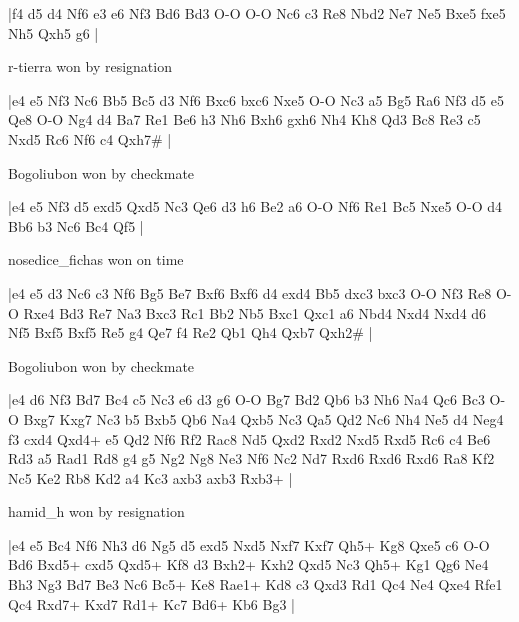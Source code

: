 \makegametitle
|f4 d5 d4 Nf6 e3 e6 Nf3 Bd6 Bd3 O-O O-O Nc6 c3 Re8 Nbd2 Ne7 Ne5 Bxe5 fxe5 Nh5 Qxh5 g6  |

\showboard

r-tierra won by resignation

\makegametitle
|e4 e5 Nf3 Nc6 Bb5 Bc5 d3 Nf6 Bxc6 bxc6 Nxe5 O-O Nc3 a5 Bg5 Ra6 Nf3 d5 e5 Qe8 O-O Ng4 d4 Ba7 Re1 Be6 h3 Nh6 Bxh6 gxh6 Nh4 Kh8 Qd3 Bc8 Re3 c5 Nxd5 Rc6 Nf6 c4 Qxh7\#  |

\showboard

Bogoliubon won by checkmate

\makegametitle
|e4 e5 Nf3 d5 exd5 Qxd5 Nc3 Qe6 d3 h6 Be2 a6 O-O Nf6 Re1 Bc5 Nxe5 O-O d4 Bb6 b3 Nc6 Bc4 Qf5  |

\showboard

nosedice\_fichas won on time

\makegametitle
|e4 e5 d3 Nc6 c3 Nf6 Bg5 Be7 Bxf6 Bxf6 d4 exd4 Bb5 dxc3 bxc3 O-O Nf3 Re8 O-O Rxe4 Bd3 Re7 Na3 Bxc3 Rc1 Bb2 Nb5 Bxc1 Qxc1 a6 Nbd4 Nxd4 Nxd4 d6 Nf5 Bxf5 Bxf5 Re5 g4 Qe7 f4 Re2 Qb1 Qh4 Qxb7 Qxh2\#  |

\showboard

Bogoliubon won by checkmate

\makegametitle
|e4 d6 Nf3 Bd7 Bc4 c5 Nc3 e6 d3 g6 O-O Bg7 Bd2 Qb6 b3 Nh6 Na4 Qc6 Bc3 O-O Bxg7 Kxg7 Nc3 b5 Bxb5 Qb6 Na4 Qxb5 Nc3 Qa5 Qd2 Nc6 Nh4 Ne5 d4 Neg4 f3 cxd4 Qxd4+ e5 Qd2 Nf6 Rf2 Rac8 Nd5 Qxd2 Rxd2 Nxd5 Rxd5 Rc6 c4 Be6 Rd3 a5 Rad1 Rd8 g4 g5 Ng2 Ng8 Ne3 Nf6 Nc2 Nd7 Rxd6 Rxd6 Rxd6 Ra8 Kf2 Nc5 Ke2 Rb8 Kd2 a4 Kc3 axb3 axb3 Rxb3+  |

\showboard

hamid\_h won by resignation

\makegametitle
|e4 e5 Bc4 Nf6 Nh3 d6 Ng5 d5 exd5 Nxd5 Nxf7 Kxf7 Qh5+ Kg8 Qxe5 c6 O-O Bd6 Bxd5+ cxd5 Qxd5+ Kf8 d3 Bxh2+ Kxh2 Qxd5 Nc3 Qh5+ Kg1 Qg6 Ne4 Bh3 Ng3 Bd7 Be3 Nc6 Bc5+ Ke8 Rae1+ Kd8 c3 Qxd3 Rd1 Qc4 Ne4 Qxe4 Rfe1 Qc4 Rxd7+ Kxd7 Rd1+ Kc7 Bd6+ Kb6 Bg3  |

\showboard

